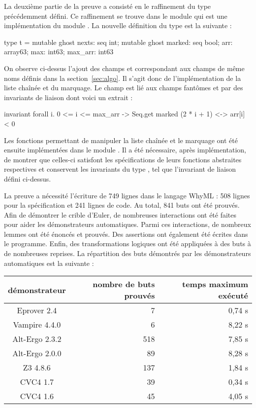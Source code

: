 \documentclass[a4paper]{easychair}
\begin{document}
La deuxième partie de la preuve a consisté en le raffinement du type 
précédemment défini. Ce raffinement se trouve dans le module
 qui est une implémentation du module .
La nouvelle définition du type  est la suivante :
\begin{why3}
type t = {
  mutable ghost nexts: seq int;
  mutable ghost marked: seq bool;
  arr: array63;
  max: int63;
  max_arr: int63
}
\end{why3}
On observe ci-dessus l'ajout des champs  et 
correspondant aux champs de même noms définis dans la section~\ref{sec:algo}.
Il s'agit donc de l'implémentation de la liste chaînée et du marquage.
Le champ  est lié aux champs fantômes  et 
par des invariants de liaison dont voici un extrait :
\begin{why3}
invariant { forall i. 0 <= i <= max_arr ->
                 Seq.get marked (2 * i + 1) <-> arr[i] < 0 }
\end{why3}
Les fonctions permettant de manipuler la liste chaînée et le marquage ont été
ensuite implémentées dans le module .
Il a été nécessaire, après implémentation, de montrer que celles-ci
satisfont les spécifications de leurs fonctions abstraites respectives et
conservent les invariants du type , tel que l'invariant de liaison
défini ci-dessus.



La preuve a nécessité l'écriture de 749 lignes dans le langage WhyML :
508 lignes pour la spécification et 241 lignes de code.
Au total, 841 buts ont été prouvés.
Afin de démontrer le crible d'Euler, de nombreuses interactions ont été
faites pour aider les démonstrateurs automatiques.
Parmi ces interactions, de nombreux lemmes ont été énoncés et prouvés.
Des assertions ont également été écrites dans le programme.
Enfin, des transformations logiques ont  été appliquées à des buts à
de nombreuses reprises.
La répartition des buts démontrés par les démonstrateurs automatiques est la
suivante :
\begin{center}
  \begin{tabular}{|c|r|r|}
    \hline
    démonstrateur & nombre de buts prouvés & temps maximum exécuté \\
    \hline\hline
    Eprover 2.4    &     7 &      0,74 s \\\hline
    Vampire 4.4.0  &     6 &      8,22 s \\\hline
    Alt-Ergo 2.3.2 &   518 &      7,85 s \\\hline
    Alt-Ergo 2.0.0 &    89 &      8,28 s \\\hline
    Z3 4.8.6       &   137 &      1,84 s \\\hline
    CVC4 1.7       &    39 &      0,34 s \\\hline
    CVC4 1.6       &    45 &      4,05 s \\\hline
  \end{tabular}
\end{center}
\end{document}
